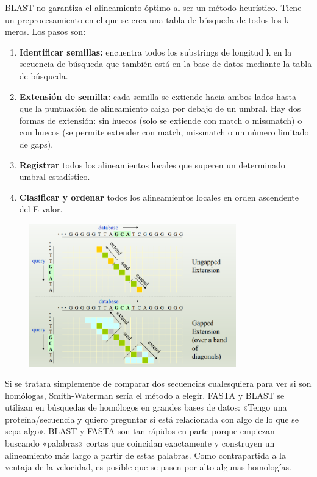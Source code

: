 BLAST no garantiza el alineamiento óptimo al ser un método heurístico. Tiene un preprocesamiento en el que se crea una tabla de búsqueda de todos los k-meros. Los pasos son:
\begin{enumerate}
\item \textbf{Identificar semillas:} encuentra todos los substrings de longitud k en la secuencia de búsqueda que también está en la base de datos mediante la tabla de búsqueda.
\item \textbf{Extensión de semilla:} cada semilla se extiende hacia ambos lados hasta que la puntuación de alineamiento caiga por debajo de un umbral. Hay dos formas de extensión: sin huecos (solo se extiende con match o missmatch) o con huecos (se permite extender con match, missmatch o un número limitado de gaps).
\item \textbf{Registrar} todos los alineamientos locales que superen un determinado umbral estadístico. 
\item \textbf{Clasificar y ordenar} todos los alineamientos locales en orden ascendente del E-valor.
\end{enumerate}

\begin{figure}[h]
\centering
\includegraphics[width = 0.8\textwidth]{figs/blast.png}
\end{figure}

Si se tratara simplemente de comparar dos secuencias cualesquiera para ver si son homólogas, Smith-Waterman sería el método a elegir. FASTA y BLAST se utilizan en búsquedas de homólogos en grandes bases de datos: «Tengo una proteína/secuencia y quiero preguntar si está relacionada con algo de lo que se sepa algo». BLAST y FASTA son tan rápidos en parte porque empiezan buscando «palabras» cortas que coincidan exactamente y construyen un alineamiento más largo a partir de estas palabras. Como contrapartida a la ventaja de la velocidad, es posible que se pasen por alto algunas homologías.

